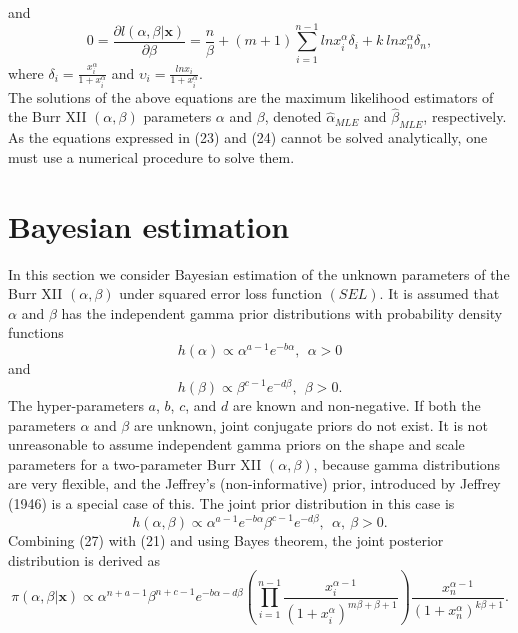 \documentclass[12pt,a4paper]{article}
\begin{document}
and
\begin{equation}
0=\frac{\partial l(\alpha, \beta|\mathbf{x})}{\partial \beta}=\frac{n}{\beta}+(m+1)\sum_{i=1}^{n-1}ln x_{i}^{\alpha}\delta_{i}+k~ln x_{n}^{\alpha}\delta_{n},
\label{beta_mle}
\end{equation}
where
$\delta_{i}=\frac{x_{i}^{\alpha}}{1+x_{i}^{\alpha}}$ and $\upsilon_{i}=\frac{ln x_{i}}{1+x_{i}^{\alpha}}$.\\The solutions of the above equations are the maximum likelihood estimators of the Burr XII $(\alpha, \beta)$ parameters $\alpha$  and $\beta$, denoted  $\hat{\alpha}_{MLE}$  and $\hat{\beta}_{MLE}$, respectively. As the equations expressed in (23) and (24) cannot be solved analytically, one must use a numerical procedure to solve them.

\section{Bayesian  estimation}
In this section we consider Bayesian estimation of the unknown parameters of the Burr XII $(\alpha, \beta)$ under squared error loss function $(SEL)$. It is assumed that  $\alpha$  and $\beta$   has the independent gamma prior distributions with probability density functions
\begin{equation}
h(\alpha)\propto \alpha^{a-1}e^{-b\alpha},~~\alpha>0
\end{equation}
and
\begin{equation}
h(\beta)\propto \beta^{c-1}e^{-d\beta},~~\beta>0.
\end{equation}
The hyper-parameters $a$, $b$, $c$, and $d$ are known and non-negative. If both the parameters $\alpha$  and $\beta$  are unknown, joint conjugate priors do not exist. It is not unreasonable to assume independent gamma priors on the shape and scale parameters for a two-parameter  Burr XII $(\alpha, \beta)$, because gamma distributions are very flexible, and the Jeffrey's (non-informative) prior, introduced by Jeffrey (1946) is a special case of this. The joint prior distribution in this case is
\begin{equation}
h(\alpha, \beta)\propto \alpha^{a-1} e^{-b\alpha} \beta^{c-1} e^{-d\beta},~~\alpha,~\beta>0.
\end{equation}
Combining (27) with  (21) and using Bayes theorem, the joint posterior distribution is derived as
\begin{equation}
\pi(\alpha, \beta|\mathbf{x})\propto\alpha^{n+a-1} \beta^{n+c-1}e^{-b\alpha-d\beta}\left(\prod_{i=1}^{n-1}\frac{x_{i}^{\alpha-1}}{(1+x_{i}^{\alpha})^{m\beta+\beta+1}}\right)\frac{x_{n}^{\alpha-1}}{(1+x_{n}^{\alpha})^{k\beta+1}}.
\label{joint_post}
\end{equation}
\end{document}
